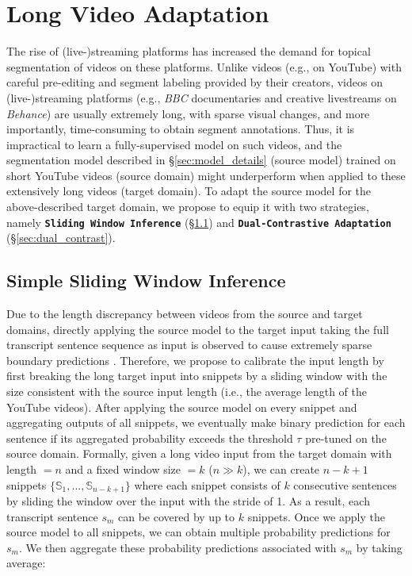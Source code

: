 \documentclass[runningheads]{llncs}
\begin{document}
\vspace{-1ex}
\section{Long Video Adaptation}
\label{sec:dual_cl}

The rise of (live-)streaming platforms has increased the demand for topical segmentation of videos on these platforms. Unlike videos (e.g., on YouTube) with careful pre-editing and segment labeling provided by their creators, videos on (live-)streaming platforms (e.g., \textit{BBC} documentaries and creative livestreams on \textit{Behance}) are usually extremely long, with sparse visual changes, and more importantly, time-consuming to obtain segment annotations. Thus, it is impractical to learn a fully-supervised model on such videos, and the segmentation model described in \S\ref{sec:model_details} (source model) trained on short YouTube videos (source domain) might underperform when applied to these extensively long videos (target domain).
To adapt the source model for the above-described target domain, 
we propose to equip it with two strategies, namely \textbf{\texttt{Sliding Window Inference}} (\S\ref{sec:slide_window}) and \textbf{\texttt{Dual-Contrastive Adaptation}} (\S\ref{sec:dual_contrast}).

\vspace{-2ex}
\subsection{Simple Sliding Window Inference}
\label{sec:slide_window}

Due to the length discrepancy between videos from the source and target domains, 
directly applying the source model to the target input taking the full transcript sentence sequence as input 
is observed to cause extremely sparse boundary predictions \cite{glavas-2020-two}. Therefore, we propose to calibrate the input length by first breaking the long target input into snippets by a sliding window with the size consistent with the source input length (i.e., the average length of the YouTube videos). %
After applying the source model on every snippet and aggregating outputs of all snippets, we eventually make binary prediction for each sentence if its aggregated probability exceeds the threshold $\tau$ pre-tuned on the source domain. Formally, given a long video input from the target domain with length $= n$ and a fixed window size $= k$ ($n \gg k$),  we can create $n-k+1$ snippets $\{\mathbb{S}_1, ..., \mathbb{S}_{n-k+1} \}$ where each snippet consists of $k$ consecutive sentences by sliding the window over the input with the stride of 1. As a result, each transcript sentence $s_m$ can be covered by up to $k$ snippets. Once we apply the source model to all snippets, we can obtain multiple probability predictions for $s_m$. We then aggregate these probability predictions associated with $s_m$ by taking average:
\end{document}
